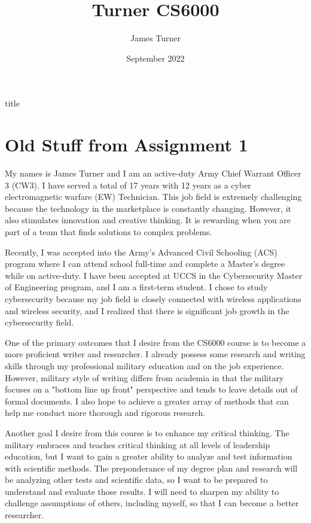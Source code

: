 \documentclass{article}
\title{Turner CS6000}
\author{James Turner}
\date{September 2022}
\begin{document}
\make title
\newpage

\section{Old Stuff from Assignment 1}
My names is James Turner and I am an active-duty Army Chief Warrant Officer
3 (CW3).  I have served a total of 17 years with 12 years as a cyber electromagnetic warfare (EW) 
Technician.  This job field is extremely challenging because the technology in the marketplace
is constantly changing.  However, it also stimulates innovation and creative thinking.  It is rewarding
when you are part of a team that finds solutions to complex problems.

Recently, I was accepted into the Army's Advanced Civil Schooling (ACS) program where I can attend school
full-time and complete a Master's degree while on active-duty.  I have been accepted at UCCS in the
Cybersecurity Master of Engineering program, and I am a first-term student.  I chose to study cybersecurity
because my job field is closely connected with wireless applications and wireless security, and I realized
that there is significant job growth in the cybersecurity field.

One of the primary outcomes that I desire from the CS6000 course is to become a more proficient writer and researcher.  I already possess some research and writing skills through my professional military education and
on the job experience.  However, military style of writing differs from academia in that the military focuses
on a "bottom line up front" perspective and tends to leave details out of formal documents.  I also hope
to achieve a greater array of methods that can help me conduct more thorough and rigorous research.

Another goal I desire from this course is to enhance my critical thinking.  The military embraces and teaches
 critical thinking at all levels of leadership education, but I want to gain a greater ability to analyze and test information with scientific methods.  The preponderance of my degree plan and research will be analyzing other tests and scientific data, so I want to be prepared to understand and evaluate those results.  I will need to sharpen my ability to challenge assumptions of others, including myself, so that I can become a better researcher.
\end{document}
